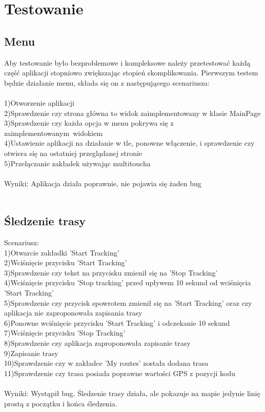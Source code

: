 	\newpage
\section{Testowanie}	%
\subsection{Menu} %
Aby testowanie było bezproblemowe i kompleksowe należy przetestować każdą część aplikacji stopniowo zwiększając stopień skomplikowania. Pierwszym testem będzie działanie menu, składa się on z następującego scenariusza:\\\\
1)Otworzenie aplikacji\\
2)Sprawdzenie czy strona główna to widok zaimplementowany w klasie MainPage\\
3)Sprawdzenie czy każda opcja w menu pokrywa się z zaimplementowanym~widokiem\\
4)Ustawienie aplikacji na działanie w tle, ponowne włączenie, i sprawdzenie czy otwiera się na ostatniej przeglądanej stronie\\
5)Przełączanie zakładek używając multitoucha\\\\
Wyniki: Aplikacja działa poprawnie, nie pojawia się żaden bug\\\\
\newpage
\subsection{Śledzenie trasy} %
Scenariusz:\\
1)Otwarcie zakładki 'Start Tracking'\\
2)Wciśnięcie przycisku 'Start Tracking'\\
3)Sprawdzenie czy tekst na przycisku zmienił się na 'Stop Tracking'\\
4)Wciśnięcie przycisku 'Stop tracking' przed upływem 10 sekund od wciśnięcia 'Start Tracking'\\
5)Sprawdzenie czy przycisk spowrotem zmienił się na 'Start Tracking' oraz czy aplikacja nie zaproponowała zapisania trasy\\
6)Ponowne wciśnięcie przycisku 'Start Tracking' i odczekanie 10 sekund\\
7)Wciśnięcie przycisku 'Stop Tracking'\\
8)Sprawdzenie czy aplikacja zaproponowała zapisanie trasy\\
9)Zapisanie trasy\\
10)Sprawdzenie czy w zakładce 'My routes' została dodana trasa\\
11)Sprawdzenie czy trasa posiada poprawne wartości GPS z pozycji kodu\\\\
Wyniki: Wystąpił bug. Śledzenie trasy działa, ale pokazuje na mapie jedynie linię prostą z początku i końca śledzenia.\\\\
\newpage
